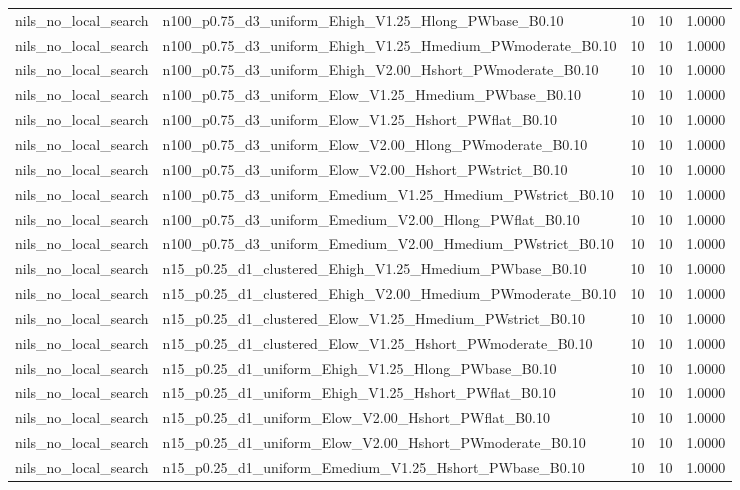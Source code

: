 \begin{tabular}{llrrr}
nils_no_local_search & n100_p0.75_d3_uniform_Ehigh_V1.25_Hlong_PWbase_B0.10 & 10 & 10 & 1.0000 \\
nils_no_local_search & n100_p0.75_d3_uniform_Ehigh_V1.25_Hmedium_PWmoderate_B0.10 & 10 & 10 & 1.0000 \\
nils_no_local_search & n100_p0.75_d3_uniform_Ehigh_V2.00_Hshort_PWmoderate_B0.10 & 10 & 10 & 1.0000 \\
nils_no_local_search & n100_p0.75_d3_uniform_Elow_V1.25_Hmedium_PWbase_B0.10 & 10 & 10 & 1.0000 \\
nils_no_local_search & n100_p0.75_d3_uniform_Elow_V1.25_Hshort_PWflat_B0.10 & 10 & 10 & 1.0000 \\
nils_no_local_search & n100_p0.75_d3_uniform_Elow_V2.00_Hlong_PWmoderate_B0.10 & 10 & 10 & 1.0000 \\
nils_no_local_search & n100_p0.75_d3_uniform_Elow_V2.00_Hshort_PWstrict_B0.10 & 10 & 10 & 1.0000 \\
nils_no_local_search & n100_p0.75_d3_uniform_Emedium_V1.25_Hmedium_PWstrict_B0.10 & 10 & 10 & 1.0000 \\
nils_no_local_search & n100_p0.75_d3_uniform_Emedium_V2.00_Hlong_PWflat_B0.10 & 10 & 10 & 1.0000 \\
nils_no_local_search & n100_p0.75_d3_uniform_Emedium_V2.00_Hmedium_PWstrict_B0.10 & 10 & 10 & 1.0000 \\
nils_no_local_search & n15_p0.25_d1_clustered_Ehigh_V1.25_Hmedium_PWbase_B0.10 & 10 & 10 & 1.0000 \\
nils_no_local_search & n15_p0.25_d1_clustered_Ehigh_V2.00_Hmedium_PWmoderate_B0.10 & 10 & 10 & 1.0000 \\
nils_no_local_search & n15_p0.25_d1_clustered_Elow_V1.25_Hmedium_PWstrict_B0.10 & 10 & 10 & 1.0000 \\
nils_no_local_search & n15_p0.25_d1_clustered_Elow_V1.25_Hshort_PWmoderate_B0.10 & 10 & 10 & 1.0000 \\
nils_no_local_search & n15_p0.25_d1_uniform_Ehigh_V1.25_Hlong_PWbase_B0.10 & 10 & 10 & 1.0000 \\
nils_no_local_search & n15_p0.25_d1_uniform_Ehigh_V1.25_Hshort_PWflat_B0.10 & 10 & 10 & 1.0000 \\
nils_no_local_search & n15_p0.25_d1_uniform_Elow_V2.00_Hshort_PWflat_B0.10 & 10 & 10 & 1.0000 \\
nils_no_local_search & n15_p0.25_d1_uniform_Elow_V2.00_Hshort_PWmoderate_B0.10 & 10 & 10 & 1.0000 \\
nils_no_local_search & n15_p0.25_d1_uniform_Emedium_V1.25_Hshort_PWbase_B0.10 & 10 & 10 & 1.0000 \\

\end{tabular}
